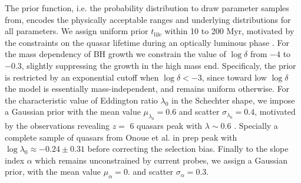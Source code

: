 \documentclass[twocolumn, twocolappendix]{aastex63}
\newcommand{\tlife}{t_\mathrm{life}}
\newcommand{\blue}[1]{\textcolor{blue}{ #1}}
\begin{document}
\begin{CJK*}{UTF8}{gbsn}
The prior function, i.e. the probability distribution to draw parameter samples from, 
encodes the physically acceptable ranges and underlying distributions for all parameters. 
We assign uniform prior $\tlife$ within 10 to 200 Myr, 
motivated by the constraints on the quasar lifetime during an optically luminous phase \citep[e.g.,][]{2004cbhg.symp..169M}.
For the mass dependency of BH growth we constrain the value of $\log \delta$ from $-4$ to $-0.3$, 
slightly suppressing the growth in the high mass end. 
Specificaly, the prior is restricted by an exponential cutoff when $\log \delta < -3$,
since toward low $\log\delta$ the model is essentially mass-independent,
and remains uniform otherwise. 
For the characteristic value of Eddington ratio $\lambda_0$ in the Schechter shape, 
we impose a Gaussian prior with the mean value $\mu_{\lambda_0}=0.6$ and scatter $\sigma_{\lambda_0}=0.4$, 
motivated by the observations revealing $z=$ 6 quasars peak with $\lambda \sim 0.6$ 
\citep[e.g.,][]{2010AJ....140..546W}.
Specially a complete sample of quasars from Onoue et al. in prep peak with $\log \lambda_0 \approx -0.24 \pm 0.31$ 
before correcting the selection bias. 
Finally to the slope index $\alpha$ which remains unconstrained by current probes,
we assign a Gaussian prior, with the mean value $\mu_{\alpha}=0.$ and scatter $\sigma_{\alpha}=0.3$.
  

\end{CJK*}
\end{document}
